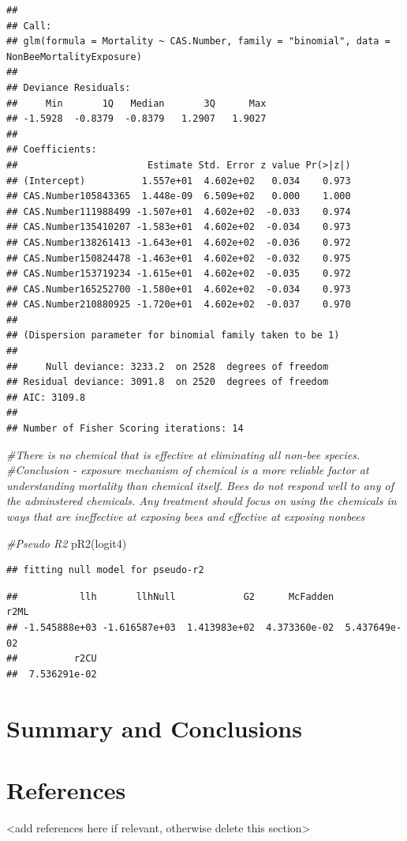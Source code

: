 \documentclass[
  12pt,
]{article}
\newenvironment{Shaded}{\begin{snugshade}}{\end{snugshade}}
\newcommand{\CommentTok}[1]{\textcolor[rgb]{0.56,0.35,0.01}{\textit{#1}}}
\newcommand{\FunctionTok}[1]{\textcolor[rgb]{0.00,0.00,0.00}{#1}}
\newcommand{\NormalTok}[1]{#1}
\begin{document}
\begin{verbatim}
## 
## Call:
## glm(formula = Mortality ~ CAS.Number, family = "binomial", data = NonBeeMortalityExposure)
## 
## Deviance Residuals: 
##     Min       1Q   Median       3Q      Max  
## -1.5928  -0.8379  -0.8379   1.2907   1.9027  
## 
## Coefficients:
##                       Estimate Std. Error z value Pr(>|z|)
## (Intercept)          1.557e+01  4.602e+02   0.034    0.973
## CAS.Number105843365  1.448e-09  6.509e+02   0.000    1.000
## CAS.Number111988499 -1.507e+01  4.602e+02  -0.033    0.974
## CAS.Number135410207 -1.583e+01  4.602e+02  -0.034    0.973
## CAS.Number138261413 -1.643e+01  4.602e+02  -0.036    0.972
## CAS.Number150824478 -1.463e+01  4.602e+02  -0.032    0.975
## CAS.Number153719234 -1.615e+01  4.602e+02  -0.035    0.972
## CAS.Number165252700 -1.580e+01  4.602e+02  -0.034    0.973
## CAS.Number210880925 -1.720e+01  4.602e+02  -0.037    0.970
## 
## (Dispersion parameter for binomial family taken to be 1)
## 
##     Null deviance: 3233.2  on 2528  degrees of freedom
## Residual deviance: 3091.8  on 2520  degrees of freedom
## AIC: 3109.8
## 
## Number of Fisher Scoring iterations: 14
\end{verbatim}

\begin{Shaded}
\begin{Highlighting}[]
\CommentTok{\#There is no chemical that is effective at eliminating all non{-}bee species. }
\CommentTok{\#Conclusion {-} exposure mechanism of chemical is a more reliable factor at understanding mortality than chemical itself. Bees do not respond well to any of the adminstered chemicals. Any treatment should focus on using the chemicals in ways that are ineffective at exposing bees and effective at exposing nonbees}

\CommentTok{\#Pseudo R2}
 \FunctionTok{pR2}\NormalTok{(logit4)}
\end{Highlighting}
\end{Shaded}

\begin{verbatim}
## fitting null model for pseudo-r2
\end{verbatim}

\begin{verbatim}
##           llh       llhNull            G2      McFadden          r2ML 
## -1.545888e+03 -1.616587e+03  1.413983e+02  4.373360e-02  5.437649e-02 
##          r2CU 
##  7.536291e-02
\end{verbatim}

\newpage

\hypertarget{summary-and-conclusions}{%
\section{Summary and Conclusions}\label{summary-and-conclusions}}

\newpage

\hypertarget{references}{%
\section{References}\label{references}}

\textless add references here if relevant, otherwise delete this
section\textgreater{}
\end{document}

